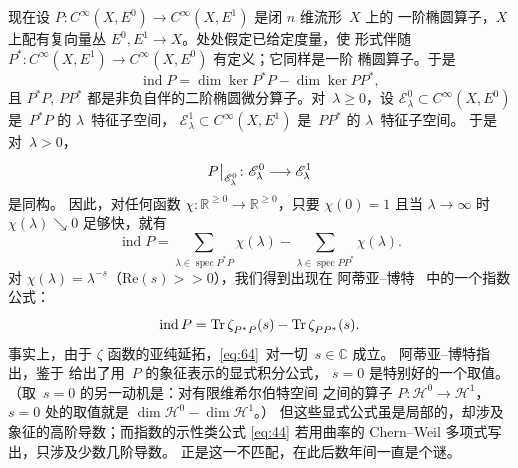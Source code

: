 \documentclass[11pt]{amsart}
\theoremstyle{definition}
\theoremstyle{remark}
\theoremstyle{plain}
\numberwithin{equation}{section}
\renewcommand{\:}{\colon}
\newcommand{\CC}{{\mathbb C}}
\newcommand{\RR}{{\mathbb R}}
\DeclareMathOperator{\Tr}{Tr}
\DeclareMathOperator{\coker}{coker}
\DeclareMathOperator{\ind}{ind}
\DeclareRobustCommand{\mstrut}{^{\vphantom{1*\prime y\vee M}}}
\newcommand{\res}[1]{\negmedspace\bigm|\mstrut_{#1}}
\DeclareMathOperator{\spec}{spec}
\newcommand{\sE}{\mathscr{E}}
\newcommand{\sH}{\mathscr{H}}
\newcommand{\zD}{\zeta \mstrut _\Delta }
\renewcommand{\Re}{\text{Re}}
\begin{document}
现在设 $P\:C^{\infty}(X,E^0)\to C^{\infty}(X,E^1)$ 是闭 $n$ 维流形~$X$ 上的
一阶椭圆算子，$X$ 上配有复向量丛 $E^0,E^1\to X$。处处假定已给定度量，使
形式伴随 $P^*\:C^{\infty}(X,E^1)\to C^{\infty}(X,E^0)$ 有定义；它同样是一阶
椭圆算子。于是
  \begin{equation}\label{eq:61}
     \ind P = \dim\ker P^*P - \dim\ker PP^*, 
  \end{equation}
且 $P^*P,\,PP^*$ 都是非负自伴的二阶椭圆微分算子。对~$\lambda \ge0$，设
$\sE^0_\lambda \subset C^{\infty}(X,E^0)$ 是~$P^*P$ 的 $\lambda $~特征子空间，
$\sE^1_\lambda \subset C^{\infty}(X,E^1)$ 是~$PP^*$ 的 $\lambda $~特征子空间。
于是对~$\lambda >0$，
  \begin{equation}\label{eq:62}
     P\res{\sE^0_\lambda }\:\sE^0_\lambda \longrightarrow \sE^1_\lambda 
  \end{equation}
是同构。
因此，对任何函数 $\chi \:\RR^{\ge0}\to\RR^{\ge0}$，只要 $\chi (0)=1$ 且当
$\lambda \to\infty $ 时 $\chi (\lambda )\searrow0$ 足够快，就有
  \begin{equation}\label{eq:63}
     \ind P = \sum\limits_{\lambda \in \spec P^*P}\chi (\lambda ) -
     \sum\limits_{\lambda \in \spec PP^*}\chi (\lambda ). 
  \end{equation}
对 $\chi (\lambda )=\lambda ^{-s}$（$\Re(s)>\!>0$），我们得到出现在
阿蒂亚–博特~\cite[\S8]{AB1} 中的一个指数公式：
  \begin{equation}\label{eq:64}
     \ind P = \Tr \zeta \mstrut _{P^*P}(s) - \Tr \zeta \mstrut _{PP^*}(s). 
  \end{equation}
事实上，由于 $\zeta$ 函数的亚纯延拓，\eqref{eq:64}~对一切~$s\in \CC$ 成立。
阿蒂亚–博特指出，鉴于 \cite{Se4} 给出了用~$P$ 的象征表示的显式积分公式，
$s=0$ 是特别好的一个取值。（取~$s=0$ 的另一动机是：对有限维希尔伯特空间
之间的算子 $P\:\sH^0\to\sH^1$，$s=0$ 处的取值就是
$\dim \sH^0 - \dim \sH^1$。）
但这些显式公式虽是局部的，却涉及象征的高阶导数；而指数的示性类公式
\eqref{eq:44} 若用曲率的 Chern–Weil 多项式写出，只涉及少数几阶导数。
正是这一不匹配，在此后数年间一直是个谜。
\end{document}
